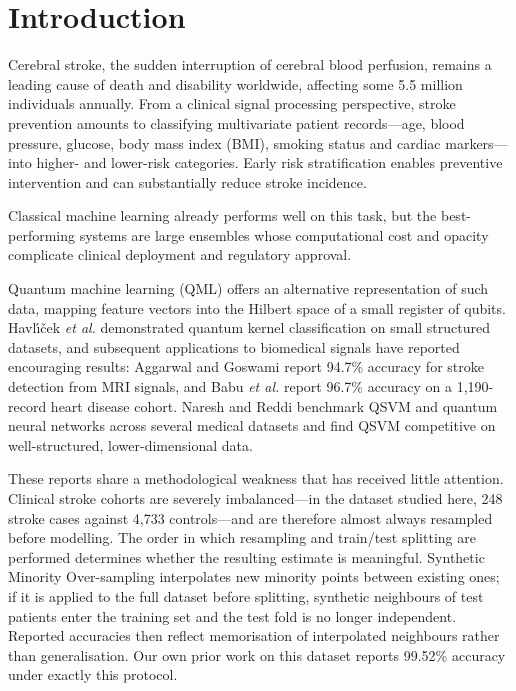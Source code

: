 \documentclass{ws-ijqi}
\begin{document}

\section{Introduction}
\label{sec:intro}

Cerebral stroke, the sudden interruption of cerebral blood perfusion, remains a
leading cause of death and disability worldwide, affecting some 5.5 million
individuals annually.\cite{feigin2025} From a clinical signal processing
perspective, stroke prevention amounts to classifying multivariate patient
records---age, blood pressure, glucose, body mass index (BMI), smoking status
and cardiac markers---into higher- and lower-risk
categories.\cite{howard2012} Early risk stratification enables preventive
intervention and can substantially reduce stroke incidence.\cite{wolf1991}

Classical machine learning already performs well on this task, but the
best-performing systems are large ensembles whose computational cost and
opacity complicate clinical deployment\cite{feng2022} and regulatory
approval.\cite{ribeiro2016}

Quantum machine learning (QML) offers an alternative representation of such
data, mapping feature vectors into the Hilbert space of a small register of
qubits.\cite{biamonte2017,schuld2019,lloyd2013} Havl\'{\i}\v{c}ek \textit{et
al.}\cite{havlicek2019} demonstrated quantum kernel classification on
small structured datasets, and subsequent applications to biomedical signals
have reported encouraging results: Aggarwal and Goswami\cite{aggarwal2026}
report 94.7\% accuracy for stroke detection from MRI signals, and Babu
\textit{et al.}\cite{babu2024} report 96.7\% accuracy on a 1,190-record heart
disease cohort. Naresh and Reddi\cite{naresh2025} benchmark QSVM and quantum
neural networks across several medical datasets and find QSVM competitive on
well-structured, lower-dimensional data.

These reports share a methodological weakness that has received little
attention. Clinical stroke cohorts are severely imbalanced---in the dataset
studied here, 248 stroke cases against 4,733 controls---and are therefore
almost always resampled before modelling. The order in which resampling and
train/test splitting are performed determines whether the resulting estimate is
meaningful. Synthetic Minority Over-sampling\cite{shinde2024} interpolates new
minority points between existing ones; if it is applied to the full dataset
before splitting, synthetic neighbours of test patients enter the training set
and the test fold is no longer independent. Reported accuracies then reflect
memorisation of interpolated neighbours rather than generalisation. Our own
prior work on this dataset\cite{shinde2024} reports 99.52\% accuracy under
exactly this protocol.
\end{document}

